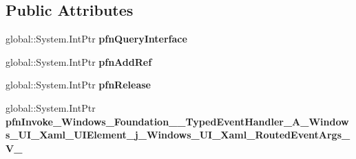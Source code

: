 \subsection*{Public Attributes}
\begin{DoxyCompactItemize}
\item 
\mbox{\label{struct_windows_1_1_foundation_1_1_typed_event_handler___a___windows___u_i___xaml___u_i_element__783b71f1d8ea86c7251f457c77949e7c_aa5e9bb3005f6d27b379d00f0c40d1c0f}} 
global\+::\+System.\+Int\+Ptr {\bfseries pfn\+Query\+Interface}
\item 
\mbox{\label{struct_windows_1_1_foundation_1_1_typed_event_handler___a___windows___u_i___xaml___u_i_element__783b71f1d8ea86c7251f457c77949e7c_abe695822d2f7ef46e9c79cc9727b8b51}} 
global\+::\+System.\+Int\+Ptr {\bfseries pfn\+Add\+Ref}
\item 
\mbox{\label{struct_windows_1_1_foundation_1_1_typed_event_handler___a___windows___u_i___xaml___u_i_element__783b71f1d8ea86c7251f457c77949e7c_a0de456c1b1ae0709bb90eb076af57f14}} 
global\+::\+System.\+Int\+Ptr {\bfseries pfn\+Release}
\item 
\mbox{\label{struct_windows_1_1_foundation_1_1_typed_event_handler___a___windows___u_i___xaml___u_i_element__783b71f1d8ea86c7251f457c77949e7c_a6484f654e2ddade34d8470ef8ee55ff4}} 
global\+::\+System.\+Int\+Ptr {\bfseries pfn\+Invoke\+\_\+\+Windows\+\_\+\+Foundation\+\_\+\+\_\+\+Typed\+Event\+Handler\+\_\+\+A\+\_\+\+Windows\+\_\+\+U\+I\+\_\+\+Xaml\+\_\+\+U\+I\+Element\+\_\+j\+\_\+\+Windows\+\_\+\+U\+I\+\_\+\+Xaml\+\_\+\+Routed\+Event\+Args\+\_\+\+V\+\_\+}
\end{DoxyCompactItemize}
